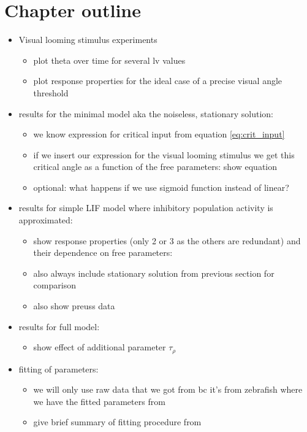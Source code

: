 \documentclass[a4paper,10pt,hidelinks]{scrreprt}
\begin{document}
	\section{Chapter outline}
	\begin{itemize}
		\item Visual looming stimulus experiments
		\begin{itemize}
			\item plot theta over time for several lv values
			\item plot response properties for the ideal case of a precise visual angle threshold
		\end{itemize}
		\item results for the minimal model aka the noiseless, stationary solution:
		\begin{itemize}
			\item we know expression for critical input from equation \ref{eq:crit_input}
			\item if we insert our expression for the visual looming stimulus we get this critical 
			angle as a function of the free parameters: show equation
			\item optional: what happens if we use sigmoid function instead of linear?
		\end{itemize}
		\item results for simple LIF model where inhibitory population activity is approximated:
		\begin{itemize}
			\item show response properties (only 2 or 3 as the others are redundant) and their 
			dependence on free parameters: 
			\item also always include stationary solution from previous section for comparison
			\item also show preuss data
		\end{itemize}
		\item results for full model:
		\begin{itemize}
			\item show effect of additional parameter $\tau_{\rho}$
		\end{itemize}
		\item fitting of parameters:
		\begin{itemize}
			\item we will only use raw data that we got from \cite{Bhattacharyya2017} bc it's from 
			zebrafish where we have the fitted parameters from \cite{Koyama2016}
			\item give brief summary of fitting procedure from \cite{Lueckmann2018}

\end{itemize}
\end{itemize}
\end{document}
